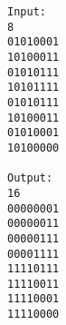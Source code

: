 \begin{verbatim}
Input:
8
01010001
10100011
01010111
10101111
01010111
10100011
01010001
10100000

Output:
16
00000001
00000011
00000111
00001111
11110111
11110011
11110001
11110000
\end{verbatim}